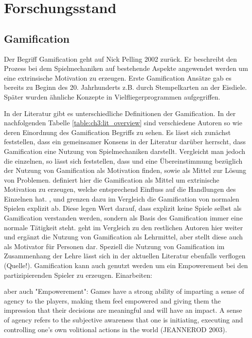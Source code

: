 \chapter{Forschungsstand}
\label{sec:S3_Forschungsstand}

\section{Gamification}
\label{subsec:S3_Gamification}

Der Begriff Gamification geht auf Nick Pelling 2002 zurück.
Er beschreibt den Prozess bei dem Spielmechaniken auf bestehende Aspekte angewendet werden um eine extrinsische Motivation zu erzeugen.\citep{Marczewski.2013}
Erste Gamification Ansätze gab es bereits zu Beginn des 20. Jahrhunderts z.B. durch Stempelkarten an der Eisdiele. Später wurden ähnliche Konzepte in Vielfliegerprogrammen aufgegriffen.

In der Literatur gibt es unterschiedliche Definitionen der Gamification.
In der nachfolgenden Tabelle \ref{table:ch3:lit_overview} sind verschiedene Autoren so wie deren Einordnung des Gamification Begriffs zu sehen.
Es lässt sich zunächst feststellen, dass ein gemeinsamer Konsens in der Literatur darüber herrscht, dass Gamification eine Nutzung von Spielmechaniken darstellt.
Vergleicht man jedoch die einzelnen, so lässt sich feststellen, dass \cite{Zichermann.2011} und \cite{Kapp.2012} eine Übereinstimmung bezüglich der Nutzung von Gamification als Motivation finden, sowie als Mittel zur Lösung von Problemen. \cite{Zichermann.2011} definiert hier die Gamification als Mittel um extrinische Motivation zu erzeugen, welche entsprechend Einfluss auf die Handlungen des Einzelnen hat.
\cite{Deterding.2011}, \cite{Breuer.2011} und \cite{Oxford.2013} grenzen dazu im Vergleich die Gamification von normalen Spielen explizit ab. Diese legen Wert darauf, dass explizit keine Spiele selbst als Gamification verstanden werden, sondern als Basis des Gamification  immer eine normale Tätigkeit steht.
\cite{Kapp.2012} geht im Vergleich zu den restlichen Autoren hier weiter und ergänzt die Nutzung von Gamification als Lehrmittel, aber stellt diese auch als Motivator für Personen dar. Speziell die Nutzung von Gamification im Zusammenhang der Lehre lässt sich in der aktuellen Literatur ebenfalls verflogen (Quelle!).
Gamification kann auch genutzt werden um ein Empowerement bei den partizipierenden Spieler zu erzeugen. Einarbeiten:

aber auch "Empowerement":
Games have a strong ability of imparting a sense of agency to the players, making them feel
empowered and giving them the impression that their decisions are meaningful and will
have an impact. A sense of agency refers to the subjective awareness that one is initiating,
executing and controlling one’s own volitional actions in the world (JEANNEROD 2003).

